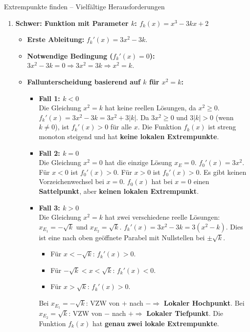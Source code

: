 \begin{loesungsumgebung}{Extrempunkte finden – Vielfältige Herausforderungen}
\begin{enumerate}[label=(\alph*)]
    \item \textbf{Schwer: Funktion mit Parameter $k$: $f_k(x) = x^3 - 3kx + 2$}
    \begin{itemize}
        \item \textbf{Erste Ableitung:} $f_k'(x) = 3x^2 - 3k$.
        \item \textbf{Notwendige Bedingung ($f_k'(x)=0$):}
        $3x^2 - 3k = 0 \Rightarrow 3x^2 = 3k \Rightarrow x^2 = k$.
        \item \textbf{Fallunterscheidung basierend auf $k$ für $x^2=k$:}
        \begin{itemize}
            \item \textbf{Fall 1: $k < 0$} \\
            Die Gleichung $x^2=k$ hat keine reellen Lösungen, da $x^2 \ge 0$.
            $f_k'(x) = 3x^2 - 3k = 3x^2 + 3|k|$. Da $3x^2 \ge 0$ und $3|k| > 0$ (wenn $k \neq 0$), ist $f_k'(x) > 0$ für alle $x$.
            Die Funktion $f_k(x)$ ist streng monoton steigend und hat \textbf{keine lokalen Extrempunkte}.
            \item \textbf{Fall 2: $k = 0$} \\
            Die Gleichung $x^2=0$ hat die einzige Lösung $x_E=0$.
            $f_0'(x) = 3x^2$.
            Für $x<0$ ist $f_0'(x) > 0$. Für $x>0$ ist $f_0'(x) > 0$.
            Es gibt keinen Vorzeichenwechsel bei $x=0$. $f_0(x)$ hat bei $x=0$ einen \textbf{Sattelpunkt}, aber \textbf{keinen lokalen Extrempunkt}.
            \item \textbf{Fall 3: $k > 0$} \\
            Die Gleichung $x^2=k$ hat zwei verschiedene reelle Lösungen: $x_E_1 = -\sqrt{k}$ und $x_E_2 = \sqrt{k}$.
            $f_k'(x) = 3x^2 - 3k = 3(x^2-k)$. Dies ist eine nach oben geöffnete Parabel mit Nullstellen bei $\pm\sqrt{k}$.
            \begin{itemize}
                \item Für $x < -\sqrt{k}$: $f_k'(x) > 0$.
                \item Für $-\sqrt{k} < x < \sqrt{k}$: $f_k'(x) < 0$.
                \item Für $x > \sqrt{k}$: $f_k'(x) > 0$.
            \end{itemize}
            Bei $x_E_1 = -\sqrt{k}$: VZW von $+$ nach $- \Rightarrow$ \textbf{Lokaler Hochpunkt}.
            Bei $x_E_2 = \sqrt{k}$: VZW von $-$ nach $+ \Rightarrow$ \textbf{Lokaler Tiefpunkt}.
            Die Funktion $f_k(x)$ hat \textbf{genau zwei lokale Extrempunkte}.
        \end{itemize}

\end{itemize}
\end{enumerate}
\end{loesungsumgebung}
